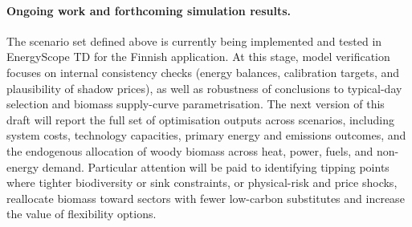 \documentclass{article}
\begin{document}
\paragraph{Ongoing work and forthcoming simulation results.}
The scenario set defined above is currently being implemented and tested in EnergyScope TD for the Finnish application. At this stage, model verification focuses on internal consistency checks (energy balances, calibration targets, and plausibility of shadow prices), as well as robustness of conclusions to typical-day selection and biomass supply-curve parametrisation. The next version of this draft will report the full set of optimisation outputs across scenarios, including system costs, technology capacities, primary energy and emissions outcomes, and the endogenous allocation of woody biomass across heat, power, fuels, and non-energy demand. Particular attention will be paid to identifying tipping points where tighter biodiversity or sink constraints, or physical-risk and price shocks, reallocate biomass toward sectors with fewer low-carbon substitutes and increase the value of flexibility options.







\newpage

\appendix
\end{document}
